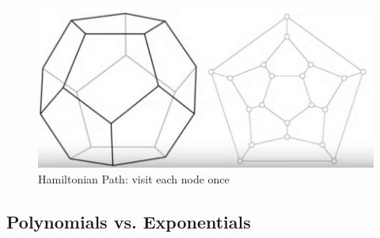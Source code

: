 \documentclass[]{article}
\begin{document}
\begin{figure}[H]
	\begin{center}
		\caption{Hamiltonian Path: visit each node once}
		\includegraphics[width=\textwidth]{Hamiltonian}
	\end{center}
\end{figure}

\subsection{Polynomials vs. Exponentials}
\end{document}
